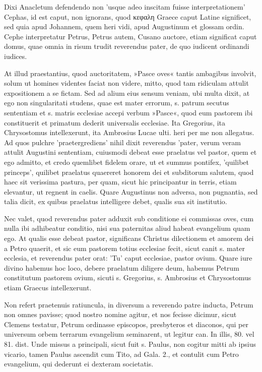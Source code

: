 Dixi Anacletum defendendo non 'usque adeo inscitam fuisse interpretationem' Cephas, id est caput, non ignorans, quod κεφαλη Graece caput Latine significet, sed quia apud Johannem, quem heri vidi, apud Augustinum et glossam ordin. Cephe interpretatur Petrus, Petrus autem, Cusano auctore, etiam significat caput domus, quae omnia in risum trudit reverendus pater, de quo iudicent ordinandi iudices.

At illud praestantius, quod auctoritatem, »Pasce oves« tantis ambagibus involvit, solum ut homines videntes faciat non videre, mitto, quod tam ridiculam attulit expositionem a se fictam. Sed ad alium eius sensum veniam, ubi multa dixit, at ego non singularitati studens, quae est mater errorum, s. patrum secutus sententiam et s. matris ecclesiae accepi verbum »Pasce«, quod eum pastorem ibi constituerit et primatum dederit universalis ecclesiae. Ita Gregorius, ita Chrysostomus intellexerunt, ita Ambrosius Lucae ulti. heri per me non allegatus. Ad quos pulchre 'praetergrediens' nihil dixit reverendus 'pater, verum veram attulit Augustini sententiam, cuiusmodi debeat esse praelatus vel pastor, quem et ego admitto, et credo quemlibet fidelem orare, ut et summus pontifex, 'quilibet princeps', quilibet praelatus quaereret honorem dei et subditorum salutem, quod haec sit verissima pastura, per quam, sicut hic principantur in terris, etiam elevantur, ut regnent in caelis. Quare Augustinus non adversa, non pugnantia, sed talia dicit, ex quibus praelatus intelligere debet, qualis sua sit institutio.

Nec valet, quod reverendus pater adduxit sub conditione ei commissas oves, cum nulla ibi adhibeatur conditio, nisi sua paternitas aliud habeat evangelium quam ego. At qualis esse debeat pastor, significans Christus dilectionem et amorem dei a Petro quaerit, et sic eum pastorem totius ecclesiae fecit, sicut canit s. mater ecclesia, et reverendus \marginpar{\small[308]} pater orat: 'Tu' caput ecclesiae, pastor ovium. Quare iure divino habemus hoc loco, debere praelatum diligere deum, habemus Petrum constitutum pastorem ovium, sicuti s. Gregorius, s. Ambrosius et Chrysostomus etiam Graecus intellexerunt.

Non refert praetenuis ratiuncula, in diversum a reverendo patre inducta, Petrum non omnes pavisse; quod nostro nomine agitur, et nos fecisse dicimur, sicut Clemens testatur, Petrum ordinasse episcopos, presbyteros et diaconos, qui per universum orbem terrarum evangelium seminarent, ut legitur can. In illis, 80. vel 81. dist. Unde missus a principali, sicut fuit s. Paulus, non cogitur mitti ab ipsius vicario, tamen Paulus ascendit cum Tito, ad Gala. 2., et contulit cum Petro evangelium, qui dederunt ei dexteram societatis.


